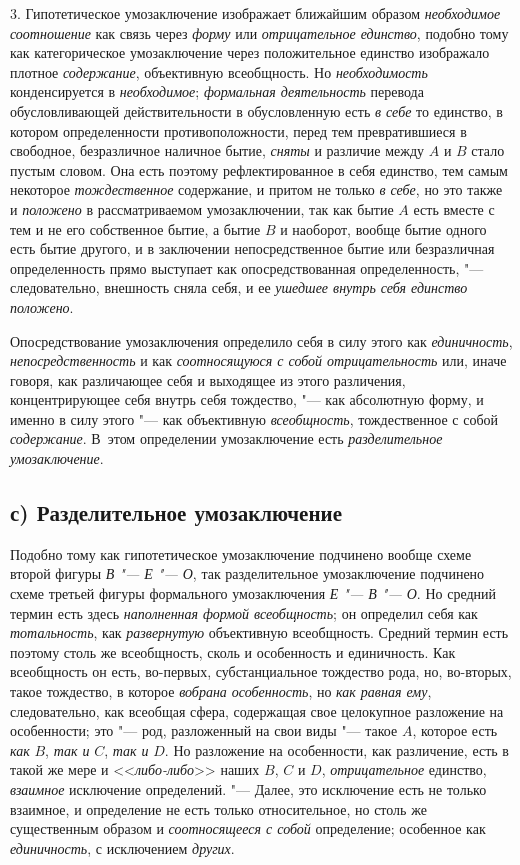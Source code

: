 {{3. Гипотетическое умозаключение изображает ближайшим образом
{\em необходимое соотношение}
как связь через {\em форму} или {\em отрицательное единство},
подобно тому как категорическое умозаключение через
положительное единство изображало плотное
{\em содержание}, объективную всеобщность. Но {\em необходимость}
конденсируется в {\em необходимое}; {\em формальная деятельность}
перевода обусловливающей действительности в обусловленную есть {\em в себе} то
единство, в котором определенности противоположности, перед тем
превратившиеся в свободное, безразличное наличное бытие,
{\em сняты} и различие между $A$ и $B$ стало пустым
словом. Она есть поэтому рефлектированное в себя единство,
тем самым некоторое {\em тождественное}
содержание, и притом не только {\em в себе}, но это также и {\em положено} в
рассматриваемом умозаключении, так как бытие $A$ есть вместе с тем
и не его собственное бытие, а бытие $B$ и наоборот,
вообще бытие одного есть бытие другого, и в заключении непосредственное
бытие или безразличная определенность прямо выступает как опосредствованная
определенность, "--- следовательно, внешность сняла себя, и ее
{\em ушедшее внутрь себя единство положено}.

Опосредствование умозаключения определило себя в силу этого
как {\em единичность}, {\em непосредственность} и
как {\em соотносящуюся с собой
отрицательность} или, иначе говоря, как различающее себя и
выходящее из этого различения, концентрирующее себя внутрь себя тождество,
"--- как абсолютную форму, и именно в силу этого "--- как объективную
{\em всеобщность}, тождественное с собой {\em содержание}. В~этом
определении умозаключение есть {\em разделительное умозаключение}.

\subsection[с) Разделительное умозаключение]{с) Разделительное умозаключение}
Подобно тому как гипотетическое умозаключение подчинено вообще
схеме второй фигуры {\em В "--- Е "--- О}, так разделительное
умозаключение подчинено схеме третьей фигуры формального умозаключения
{\em Е "--- В "--- О}. Но средний термин есть здесь
{\em наполненная формой всеобщность};
он определил себя как {\em тотальность}, как {\em развернутую}
объективную всеобщность. Средний термин есть поэтому столь же
всеобщность, сколь и особенность и единичность. Как всеобщность он есть,
во-первых, субстанциальное тождество рода, но, во-вторых, такое тождество,
в которое {\em вобрана особенность}, но {\em как равная ему},
следовательно, как всеобщая сфера, содержащая свое целокупное
разложение на особенности; это "--- род, разложенный на свои
виды "--- такое $A$,
которое есть {\em как} $B$, {\em так и} $C$, {\em так и} $D$. Но
разложение на особенности, как различение, есть в такой же мере и
<<{\em либо-либо}>> наших $B$, $C$ и $D$, {\em отрицательное}
единство, {\em взаимное} исключение определений. "--- Далее, это
исключение есть не только взаимное, и определение не есть только
относительное, но столь же существенным образом и {\em соотносящееся с собой}
определение; особенное как {\em единичность}, с исключением {\em других}.

}}
